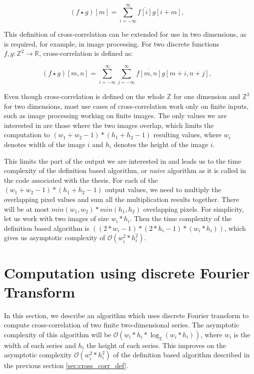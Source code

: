 \[
(f \star g)[m] = \sum_{i=-\infty}^{\infty} \overline{f[i]}g[i + m],
\] 



This definition of cross-correlation can be extended for use in two dimensions, as is required, for example, in image processing.
For two discrete functions \( f, g : \mathbb{Z}^2 \rightarrow \mathbb{R} \), cross-correlation is defined as:

\[
(f \star g)[m,n] = \sum_{i=-\infty}^{\infty} \sum_{j=-\infty}^{\infty} \overline{f[m,n]}g[m + i,n + j],
\]

Even though cross-correlation is defined on the whole $\mathbb{Z}$ for one dimension and $\mathbb{Z}^2$ for two dimensions, most use cases of cross-correlation work only on finite inputs, such as image processing working on finite images. The only values we are interested in are those where the two images overlap, which limits the computation to $(w_1 + w_2 - 1) * (h_1 + h_2 - 1)$ resulting values, where $w_i$ denotes width of the image $i$ and $h_i$ denotes the height of the image $i$.

This limits the part of the output we are interested in and leads us to the time complexity of the definition based algorithm, or \textit{naive} algorithm as it is called in the code associated with the thesis. For each of the $(w_1 + w_2 - 1) * (h_1 + h_2 - 1)$ output values, we need to multiply the overlapping pixel values and sum all the multiplication results together. There will be at most $min(w_1, w_2) * min(h_1, h_2)$ overlapping pixels. For simplicity, let us work with two images of size $w_i*h_i$. Then the time complexity of the definition based algorithm is $((2*w_i-1)*(2 * h_i - 1) * (w_i * h_i))$, which gives us asymptotic complexity of $\mathcal{O}(w_i^2*h_i^2)$.

\section{Computation using discrete Fourier Transform}
\label{sec:cross_corr_fft}

In this section, we describe an algorithm which uses discrete Fourier transform to compute cross-correlation of two finite two-dimensional series. The asymptotic complexity of this algorithm will be $\mathcal{O}(w_i*h_i*\log_2(w_i*h_i))$, where $w_i$ is the width of each series and $h_i$ the height of each series. This improves on the asymptotic complexity $\mathcal{O}(w_i^2*h_i^2)$ of the definition based algorithm described in the previous section \ref{sec:cross_corr_def}.

